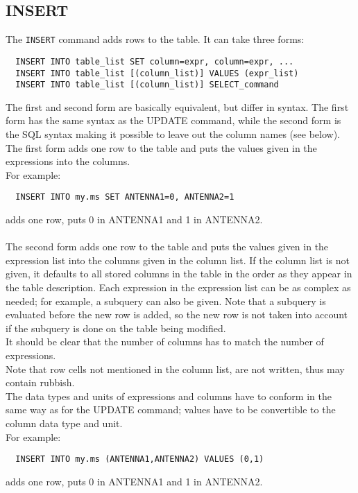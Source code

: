 \subsection{INSERT}
The \texttt{INSERT} command adds rows to the table. It can take three forms:
\begin{verbatim}
  INSERT INTO table_list SET column=expr, column=expr, ...
  INSERT INTO table_list [(column_list)] VALUES (expr_list)
  INSERT INTO table_list [(column_list)] SELECT_command
\end{verbatim}
The first and second form are basically equivalent, but differ in syntax. The
first form has the same syntax as the UPDATE command, while the second
form is the SQL syntax making it possible to leave out the column
names (see below).
\\The first form adds one row to the table and puts the values given in
the expressions into the columns.
\\For example:
\begin{verbatim}
  INSERT INTO my.ms SET ANTENNA1=0, ANTENNA2=1
\end{verbatim}
adds one row, puts 0 in ANTENNA1 and 1 in ANTENNA2.

\paragraph*{}
The second form adds one row to the table and puts the values given in
the expression list into the columns given in the column list.
If the column list is not given, it defaults to all stored columns in
the table in the order as they appear in the table description.
Each expression in the expression list can be as complex as needed;
for example, a subquery can also be given. Note that a subquery is
evaluated before the new row is added, so the new row is not taken
into account if the subquery is done on the table being modified.
\\It should be clear that the number of columns has to match the
number of expressions.
\\Note that row cells not mentioned in the column list,
are not written, thus may contain rubbish.
\\The data types and units of expressions and columns have to conform in
the same way 
as for the UPDATE command; values have to be convertible
to the column data type and unit.
\\For example:
\begin{verbatim}
  INSERT INTO my.ms (ANTENNA1,ANTENNA2) VALUES (0,1)
\end{verbatim}
adds one row, puts 0 in ANTENNA1 and 1 in ANTENNA2.

